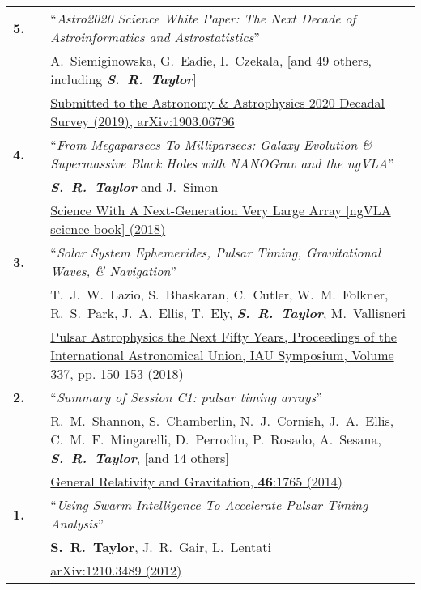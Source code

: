 \documentclass[11pt,letterpaper,sans]{moderncv}
\begin{document}
{\begin{longtable}{rp{0.3cm}p{15.8cm}}
\textbf{5.} & & ``\textit{Astro2020 Science White Paper: The Next Decade of Astroinformatics and Astrostatistics}'' \\ 
&& A.~Siemiginowska, G.~Eadie, I.~Czekala, [and 49 others, including \textit{\textbf{S.~R.~Taylor}}] \\ 
&& {\color{color1} \href{https://arxiv.org/abs/1903.06796}{Submitted to the Astronomy \& Astrophysics 2020 Decadal Survey (2019), arXiv:1903.06796}} \vspace{0.09cm}\\
\textbf{4.} & & ``\textit{From Megaparsecs To Milliparsecs: Galaxy Evolution \& Supermassive Black Holes with NANOGrav and the ngVLA}'' \\ 
&& \textit{\textbf{S.~R.~Taylor}} and J.~Simon \\ 
&& \href{http://ngvla.nrao.edu/page/scibook}{{\color{color1} Science With A Next-Generation Very Large Array [ngVLA science book] (2018)}} \vspace{0.09cm}\\
\textbf{3.} & & ``\textit{Solar System Ephemerides, Pulsar Timing, Gravitational Waves, \& Navigation}'' \\ 
&& T.~J.~W.~Lazio, S.~Bhaskaran, C.~Cutler, W.~M.~Folkner, R.~S.~Park, J.~A.~Ellis, T.~Ely, \textit{\textbf{S.~R.~Taylor}}, M.~Vallisneri \\ 
&& \href{https://doi.org/10.1017/S1743921317009711}{{\color{color1} Pulsar Astrophysics the Next Fifty Years, Proceedings of the International Astronomical Union, IAU Symposium, Volume 337, pp. 150-153 (2018)}} \vspace{0.09cm}\\
\textbf{2.} & & ``\textit{Summary of Session C1: pulsar timing arrays}'' \\ 
&& R.~M.~Shannon, S.~Chamberlin, N.~J.~Cornish, J.~A.~Ellis, C.~M.~F.~Mingarelli, D.~Perrodin, P.~Rosado, A.~Sesana, \textit{\textbf{S.~R.~Taylor}}, [and 14 others] \\ 
&& \href{http://link.springer.com/article/10.1007\%2Fs10714-014-1765-4}{{\color{color1} General Relativity and Gravitation, \textbf{46}:1765 (2014)}} \vspace{0.09cm}\\
\textbf{1.} & & ``\textit{Using Swarm Intelligence To Accelerate Pulsar Timing Analysis}'' \\ 
&& \textbf{S.~R.~Taylor}, J.~R.~Gair, L.~Lentati \\ 
&& \href{https://arxiv.org/abs/1210.3489}{{\color{color1} arXiv:1210.3489 (2012)}} \vspace{0.09cm}\\
\end{longtable}
}
\end{document}
